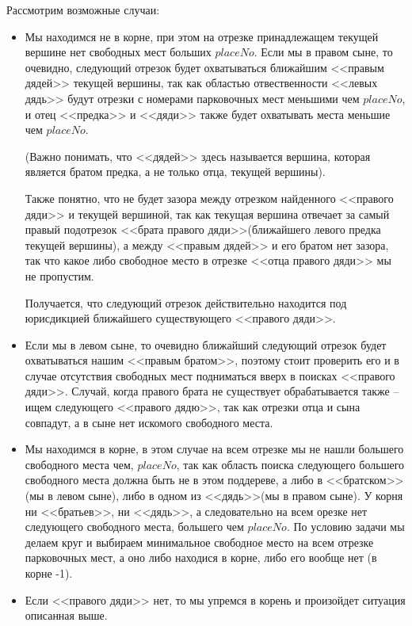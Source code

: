 \documentclass[12pt]{article}
\begin{document}
Рассмотрим возможные случаи:
\begin{itemize}
    \item Мы находимся не в корне, при этом на отрезке принадлежащем текущей вершине
          нет свободных мест больших $ placeNo $. Если мы в правом сыне, то очевидно,
          следующий отрезок будет охватываться ближайшим <<правым дядей>> текущей вершины,
          так как областью отвественности <<левых дядь>> будут отрезки
          с номерами парковочных мест меньшими чем $ placeNo $, и отец <<предка>>
          и <<дяди>> также будет охватывать места меньшие чем $ placeNo $.
          
          (Важно понимать, что <<дядей>> здесь называется вершина, которая является
          братом предка, а не только отца, текущей вершины).

          Также понятно, что не будет зазора между отрезком найденного <<правого дяди>>
          и текущей вершиной, так как текущая вершина отвечает за самый правый подотрезок
          <<брата правого дяди>>(ближайшего левого предка текущей вершины), а между
          <<правым дядей>> и его братом нет зазора, так что какое либо свободное место в
          отрезке <<отца правого дяди>> мы не пропустим.

          Получается, что следующий отрезок действительно находится под юрисдикцией
          ближайшего существующего <<правого дяди>>.

    \item Если мы в левом сыне, то очевидно ближайший следующий отрезок будет охватываться
          нашим <<правым братом>>, поэтому стоит проверить его и в случае отсутствия
          свободных мест подниматься вверх в поисках <<правого дяди>>. Случай, когда
          правого брата не существует обрабатывается также -- ищем следующего <<правого
          дядю>>, так как отрезки отца и сына совпадут, а в сыне нет искомого свободного
          места.

    \item Мы находимся в корне, в этом случае на всем отрезке мы не нашли
          большего свободного места чем, $ placeNo $, так как область поиска
          следующего большего свободного места должна быть не в этом поддереве, а
          либо в <<братском>>(мы в левом сыне), либо в одном из <<дядь>>(мы в правом сыне).
          У корня ни <<братьев>>, ни <<дядь>>, а следовательно на всем орезке
          нет следующего свободного места, большего чем $ placeNo $. По
          условию задачи мы делаем круг и выбираем минимальное свободное
          место на всем отрезке парковочных мест, а оно либо находися в корне,
          либо его вообще нет (в корне -1).

    \item Если <<правого дяди>> нет, то мы упремся в корень и произойдет ситуация
          описанная выше.
\end{itemize}
\end{document}
